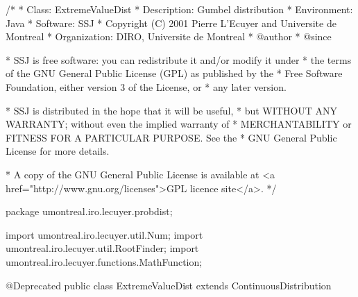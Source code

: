 \begin{code}
\begin{hide}
/*
 * Class:        ExtremeValueDist
 * Description:  Gumbel distribution
 * Environment:  Java
 * Software:     SSJ 
 * Copyright (C) 2001  Pierre L'Ecuyer and Universite de Montreal
 * Organization: DIRO, Universite de Montreal
 * @author       
 * @since

 * SSJ is free software: you can redistribute it and/or modify it under
 * the terms of the GNU General Public License (GPL) as published by the
 * Free Software Foundation, either version 3 of the License, or
 * any later version.

 * SSJ is distributed in the hope that it will be useful,
 * but WITHOUT ANY WARRANTY; without even the implied warranty of
 * MERCHANTABILITY or FITNESS FOR A PARTICULAR PURPOSE.  See the
 * GNU General Public License for more details.

 * A copy of the GNU General Public License is available at
   <a href="http://www.gnu.org/licenses">GPL licence site</a>.
 */
\end{hide}
package umontreal.iro.lecuyer.probdist;
\begin{hide}
import umontreal.iro.lecuyer.util.Num;
import umontreal.iro.lecuyer.util.RootFinder;
import umontreal.iro.lecuyer.functions.MathFunction;
\end{hide}
@Deprecated
public class ExtremeValueDist extends ContinuousDistribution\begin{hide} {
   private double alpha;
   private double lambda;

   private static class Function implements MathFunction {
      protected int n;
      protected double mean;
      protected double[] x;

      public Function (double[] x, int n, double mean) {
         this.n = n;
         this.mean = mean;
         this.x = new double[n];

         System.arraycopy(x, 0, this.x, 0, n);
      }

      public double evaluate (double lambda) {
         if (lambda <= 0.0) return 1.0e200;
         double exp = 0.0;
         double sumXiExp = 0.0;
         double sumExp = 0.0;

         for (int i = 0; i < n; i++)
         {
            exp = Math.exp (-x[i] * lambda);
            sumExp += exp;
            sumXiExp += x[i] * exp;
         }

         return ((mean - 1.0 / lambda) * sumExp - sumXiExp);
      }
   }
\end{hide}
\end{code}
